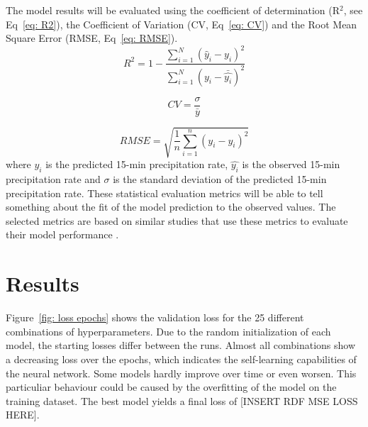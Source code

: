 \documentclass[twocolumn, 10pt, a4paper]{memoir}
\begin{document}
	The model results will be evaluated using the coefficient of determination (R$^{2}$, see Eq~\ref{eq: R2}), the Coefficient of Variation (CV, Eq~\ref{eq: CV}) and the Root Mean Square Error (RMSE, Eq~\ref{eq: RMSE}).
	\begin{equation} \label{eq: R2}
		R^2 = 1- \frac{\sum_{i=1}^{N} (\hat{y}_i - y_i)^2}{\sum_{i=1}^{N} (y_i - \bar{\hat{y_i}})^2}
	\end{equation}

	\begin{equation} \label{eq: CV}
		CV = \frac{\sigma}{\bar{y}}
	\end{equation}

	\begin{equation} \label{eq: RMSE}
		RMSE = \sqrt{\frac{1}{n} \sum_{i=1}^{n} (y_i - \hat{y_i})^2}
	\end{equation}
	where $y_i$ is the predicted 15-min precipitation rate, $\hat{y_i}$ is the observed 15-min precipitation rate and $\sigma$ is the standard deviation of the predicted 15-min precipitation rate.
	These statistical evaluation metrics will be able to tell something about the fit of the model prediction to the observed values. The selected metrics are based on similar studies that use these metrics to evaluate their model performance .
	
	
	\chapter{Results} \label{ch: results}
	Figure~\ref{fig: loss epochs} shows the validation loss for the 25 different combinations of hyperparameters. Due to the random initialization of each model, the starting losses differ between the runs. Almost all combinations show a decreasing loss over the epochs, which indicates the self-learning capabilities of the neural network. Some models hardly improve over time or even worsen. This particuliar behaviour could be caused by the overfitting of the model on the training dataset. The best model yields a final loss of [INSERT RDF MSE LOSS HERE].
	
\end{document}
